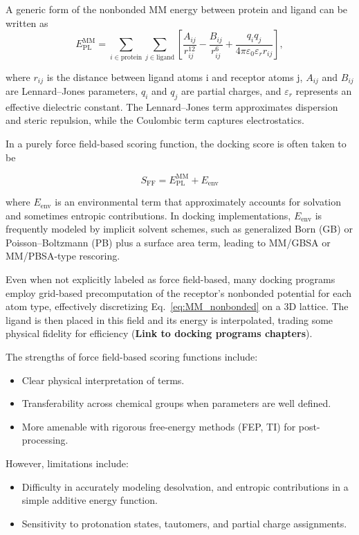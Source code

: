\documentclass[12pt]{article}
\begin{document}
A generic form of the nonbonded MM energy between protein and ligand can be written as
\begin{equation}
E_{\text{PL}}^{\text{MM}} =
\sum_{i \in \text{protein}} \sum_{j \in \text{ligand}}
\left[
\frac{A_{ij}}{r_{ij}^{12}}
-
\frac{B_{ij}}{r_{ij}^{6}}
+
\frac{q_i q_j}{4\pi \varepsilon_0 \varepsilon_r r_{ij}}
\right],
\label{eq:MM_nonbonded}
\end{equation}

where $r_{ij}$ is the distance between ligand atoms i and receptor atoms j, $A_{ij}$ and $B_{ij}$ are Lennard--Jones parameters, $q_i$ and $q_j$ are partial charges, and $\varepsilon_r$ represents an effective dielectric constant. The Lennard--Jones term approximates dispersion and steric repulsion, while the Coulombic term captures electrostatics. 

In a purely force field-based scoring function, the docking score is often taken to be

\begin{equation}
S_{\text{FF}} = E_{\text{PL}}^{\text{MM}} + E_{\text{env}}
\label{eq:MM_scoring}
\end{equation}

where $E_{\text{env}}$ is an environmental term that approximately accounts for solvation and sometimes entropic contributions. In docking implementations, $E_{\text{env}}$ is frequently modeled by implicit solvent schemes, such as generalized Born (GB) or Poisson--Boltzmann (PB) plus a surface area term, leading to MM/GBSA or MM/PBSA-type rescoring.\cite{CH3_wang2019end} 

Even when not explicitly labeled as force field-based, many docking programs employ grid-based precomputation of the receptor's nonbonded potential for each atom type, effectively discretizing Eq.~\ref{eq:MM_nonbonded} on a 3D lattice. The ligand is then placed in this field and its energy is interpolated, trading some physical fidelity for efficiency (\textbf{Link to docking programs chapters}).

The strengths of force field-based scoring functions include:
\begin{itemize}
    \item Clear physical interpretation of terms.
    \item Transferability across chemical groups when parameters are well defined.
    \item More amenable with rigorous free-energy methods (FEP, TI) for post-processing.
\end{itemize}
However, limitations include:
\begin{itemize}
    \item Difficulty in accurately modeling desolvation, and entropic contributions in a simple additive energy function.
    \item Sensitivity to protonation states, tautomers, and partial charge assignments.
\end{itemize}
\end{document}

